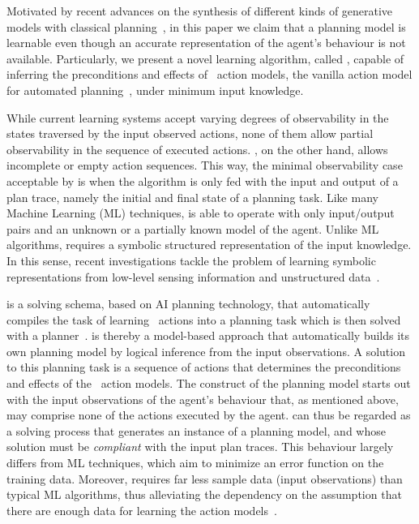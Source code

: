 Motivated by recent advances on the synthesis of different kinds of generative models with classical planning~\cite{bonet2009automatic,segovia2016generalized,segovia2016hierarchical,segovia2017generating}, in this paper we claim that a planning model is learnable even though an accurate representation of the agent's behaviour is not available. Particularly, we present a novel learning algorithm, called \FAMA, capable of inferring the preconditions and effects of \strips\ action models, the vanilla action model for automated planning~\cite{fikes1971strips}, under minimum input knowledge.

While current learning systems accept varying degrees of observability in the states traversed by the input observed actions, none of them allow partial observability in the sequence of executed actions. \FAMA, on the other hand, allows incomplete or empty action sequences. This way, the minimal observability case acceptable by \FAMA is when the algorithm is only fed with the input and output of a plan trace, namely the initial and final state of a planning task. Like many Machine Learning (ML) techniques, \FAMA is able to operate with only input/output pairs and an unknown or a partially known model of the agent. Unlike ML algorithms, \FAMA requires a symbolic structured representation of the input knowledge. In this sense, recent investigations tackle the problem of learning symbolic representations from low-level sensing information and unstructured data~\cite{KonidarisKL18,AsaiF18}.

\FAMA is a solving schema, based on AI planning technology, that automatically compiles the task of learning \strips\ actions into a planning task which is then solved with a planner~\cite{aineto2018learning}. \FAMA is thereby a model-based approach that automatically builds its own planning model by logical inference from the input observations. A solution to this planning task is a sequence of actions that determines the preconditions and effects of the \strips\ action models. The construct of the planning model starts out with the input observations of the agent's behaviour that, as mentioned above, may comprise none of the actions executed by the agent. \FAMA can thus be regarded as a solving process that generates an instance of a planning model, and whose solution must be \emph{compliant} with the input plan traces. This behaviour largely differs from ML techniques, which aim to minimize an error function on the training data. Moreover, \FAMA requires far less sample data (input observations) than typical ML algorithms, thus alleviating the dependency on the assumption that there are enough data for learning the action models~\cite{Zhuo15}.

